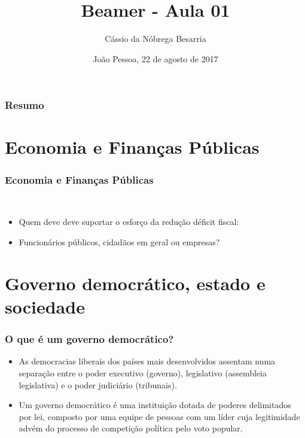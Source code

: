 \documentclass[11pt, hide notes]{beamer} %
\begin{document}
\title[Aula 01]{Beamer - Aula 01}


\author[Besarria(2022)]{Cássio da Nóbrega Besarria }


\date[]{João Pessoa, 22 de agosto de 2017}



\beamertemplatenavigationsymbolsempty


\begin{frame}
\titlepage
\end{frame}



\begin{frame}
	\frametitle{Resumo}
	\tableofcontents
\end{frame}



\section{Economia e Finanças Públicas}


\begin{frame}[label=myslide01] %

\frametitle{Economia e Finanças Públicas} {\ %

    \begin{itemize}
\pause \item Quem deve deve suportar o esforço da redução déficit fiscal:
\pause \item Funcionários públicos, cidadãos em geral ou empresas?
    \end{itemize}
     
    }  %
\end{frame}


\section{Governo democrático, estado e sociedade}
\frame{\sectionpage}


\frame
{
  \frametitle{O que é um governo democrático?}

\begin{itemize}	
	\pause \item As democracias liberais dos países mais desenvolvidos assentam numa separação entre o poder executivo (governo), legislativo (assembleia legislativa) e o poder judiciário (tribunais). 
	\pause \item Um governo democrático é uma instituição dotada de poderes delimitados por lei, composto por uma equipe de pessoas com um líder cuja legitimidade advém do processo de competição política pelo voto popular.
\end{itemize}
 
}
\end{document}
